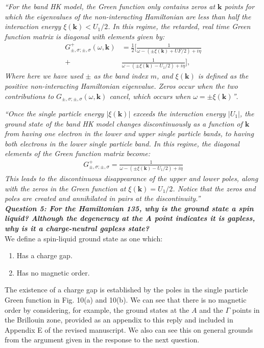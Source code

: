 \documentclass[aps,reprint,notitlepage,onecolumn,12pt]{revtex4-2}
\numberwithin{equation}{section}
\begin{document}
\textit{``For the band HK model, the Green function only contains zeros at $\mathbf{k}$ points for which the eigenvalues of the non-interacting Hamiltonian are less than half the interaction energy $\xi(\mathbf{k})<U_1/2$. 
In this regime, the retarded, real time Green function matrix is diagonal with elements given by:
\begin{align}
    G^{+}_{\pm,\sigma;\pm,\sigma}(\omega,\mathbf{k})&=\frac{1}{2}\bigg[\frac{1}{\omega-(\pm\xi(\mathbf{k})+UF/2)+i\eta}\\ \nonumber+&\frac{1}{\omega-(\pm\xi(\mathbf{k})-U_1/2)+i\eta}\bigg],
\end{align}
Where here we have used $\pm$ as the band index $m$, and $\xi(\mathbf{k})$ is defined as the positive non-interacting Hamiltonian eigenvalue. Zeros occur when the two contributions to $G_{\pm,\sigma;\pm,\sigma}(\omega,\mathbf{k})$ cancel, which occurs when $\omega=\pm\xi(\mathbf{k})$''}.

\textit{``Once the single particle energy $|\xi(\mathbf{k})|$ exceeds the interaction energy $|U_{1}|$, the ground state of the band HK model changes discontinuously as a function of $\mathbf{k}$ from having one electron in the lower and upper single particle bands, to having both electrons in the lower single particle band. In this regime, the diagonal elements of the Green function matrix become:
\begin{align}
    G^{+}_{\pm,\sigma;\pm,\sigma}=\frac{1}{\omega -(\pm\xi(\mathbf{k})-U_1/2)+i\eta}
\end{align}
This leads to the discontinuous disappearance of the upper and lower poles, along with the zeros in the Green function at $\xi(\mathbf{k})=U_1/2$. 
Notice that the zeros and poles are created and annihilated in pairs at the discontinuity.''}\\

\textbf{\textit{Question 5: For the Hamiltonian 135, why is the ground state a spin liquid? Although the degeneracy at the A point indicates it is gapless, why is it a charge-neutral gapless state?}}\\

We define a spin-liquid ground state as one which:
\begin{enumerate}
    \item Has a charge gap.
    \item Has no magnetic order.
\end{enumerate}
The existence of a charge gap is established by the poles in the single particle Green function in Fig. 10(a) and 10(b). We can see that there is no magnetic order by considering, for example, the ground states at the $A$ and the $\Gamma$ points in the Brillouin zone, provided as an appendix to this reply and included in Appendix E of the revised manuscript. We also can see this on general grounds from the argument given in the response to the next question.\\
\end{document}

